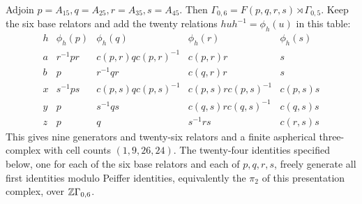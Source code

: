 \begin{proposition}\label{P5c3}
Adjoin \(p=A_{15},q=A_{25},r=A_{35},s=A_{45}\).
Then
\(\Gamma_{0,6}=F(p,q,r,s)\rtimes\Gamma_{0,5}\).
Keep the six base relators and add the twenty
relations \(huh^{-1}=\phi_h(u)\) in this table:
\[
\renewcommand{\arraystretch}{1.5}
\begin{array}{c|cccc}
h&\phi_h(p)&\phi_h(q)&\phi_h(r)&\phi_h(s)\\ \hline
a&r^{-1}pr&c(p,r)q c(p,r)^{-1}&c(p,r)r&s\\
b&p&r^{-1}qr&c(q,r)r&s\\
x&s^{-1}ps&c(p,s)q c(p,s)^{-1}
                 &c(p,s)r c(p,s)^{-1}&c(p,s)s\\
y&p&s^{-1}qs&c(q,s)r c(q,s)^{-1}&c(q,s)s\\
z&p&q&s^{-1}rs&c(r,s)s
\end{array}
\]
This gives nine generators and twenty-six
relators and a finite aspherical three-complex
with cell counts \((1,9,26,24)\).
The twenty-four identities specified below,
one for each of the six base relators and
each of \(p,q,r,s\), freely generate all
first identities modulo Peiffer identities,
equivalently the \(\pi_2\) of this presentation
complex, over \(\mathbb Z\Gamma_{0,6}\).
\end{proposition}

